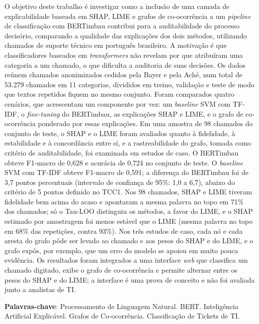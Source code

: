 \documentclass[
    12pt,                %
    openright,           %
    oneside,             %
    a4paper,             %
    english,             %
    brazil               %
]{abntex2}
\begin{document}
\begin{resumo}
O objetivo deste trabalho é investigar como a inclusão de uma camada de explicabilidade baseada em SHAP, LIME e grafos de co-ocorrência a um \textit{pipeline} de classificação com BERTimbau contribui para a auditabilidade do processo decisório, comparando a qualidade das explicações dos dois métodos, utilizando chamados de suporte técnico em português brasileiro. A motivação é que classificadores baseados em \textit{transformers} não revelam por que atribuíram uma categoria a um chamado, o que dificulta a auditoria de suas decisões. Os dados reúnem chamados anonimizados cedidos pela Bayer e pela Aché, num total de 53.279 chamados em 11 categorias, divididos em treino, validação e teste de modo que textos repetidos fiquem no mesmo conjunto. Foram comparados quatro cenários, que acrescentam um componente por vez: um \textit{baseline} SVM com TF-IDF, o \textit{fine-tuning} do BERTimbau, as explicações SHAP e LIME, e o grafo de co-ocorrência ponderado por essas explicações. Em uma amostra de 98 chamados do conjunto de teste, o SHAP e o LIME foram avaliados quanto à fidelidade, à estabilidade e à concordância entre si, e a rastreabilidade do grafo, tomada como critério de auditabilidade, foi examinada em estudos de caso. O BERTimbau obteve F1-macro de 0,628 e acurácia de 0,724 no conjunto de teste. O \textit{baseline} SVM com TF-IDF obteve F1-macro de 0,591; a diferença do BERTimbau foi de 3,7 pontos percentuais (intervalo de confiança de 95\%: 1,0 a 6,7), abaixo do critério de 5 pontos definido no TCC1.
Nos 98 chamados, SHAP e LIME tiveram fidelidade bem acima do acaso e apontaram a mesma palavra no topo em 71\% dos chamados; só o Tau-LOO distinguiu os métodos, a favor do LIME, e o SHAP estimado por amostragem foi menos estável que o LIME (mesma palavra no topo em 68\% das repetições, contra 93\%).
Nos três estudos de caso, cada nó e cada aresta do grafo pôde ser levado ao chamado e aos pesos do SHAP e do LIME, e o grafo expôs, por exemplo, que um erro do modelo se apoiou em muito pouca evidência.
Os resultados foram integrados a uma interface \textit{web} que classifica um chamado digitado, exibe o grafo de co-ocorrência e permite alternar entre os pesos do SHAP e do LIME; a interface é uma prova de conceito e não foi avaliada junto a analistas de TI.

\vspace{\onelineskip}

\noindent
\textbf{Palavras-chave}: Processamento de Linguagem Natural. BERT. Inteligência Artificial Explicável. Grafos de Co-ocorrência. Classificação de Tickets de TI.
\end{resumo}
\end{document}
